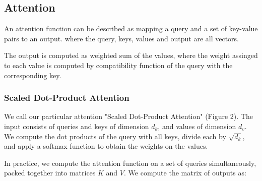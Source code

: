 \documentclass{article}
\begin{document}


\subsection{Attention}

An attention function can be described as mapping a query and a set of key-value pairs to an output. where the query, keys, values and output are all vectors.

The output is computed  as weighted sum of the values, where the weight assinged to each value is computed by compatibility function of the query with the corresponding key.

\subsubsection{Scaled Dot-Product Attention}
We call our particular attention "Scaled Dot-Product Attention" (Figure 2).
The input consists of queries and keys of dimension $d_k$, and values of dimension $d_v$. We compute the dot products of the query with all keys, divide each by $\sqrt{d_k}$, and apply a softmax function to obtain the weights on the values.

In practice, we compute the attention function on  a set of queries simultaneously, packed together into matrices $K$ and $V$. We compute the matrix of outputs as:
\end{document}
